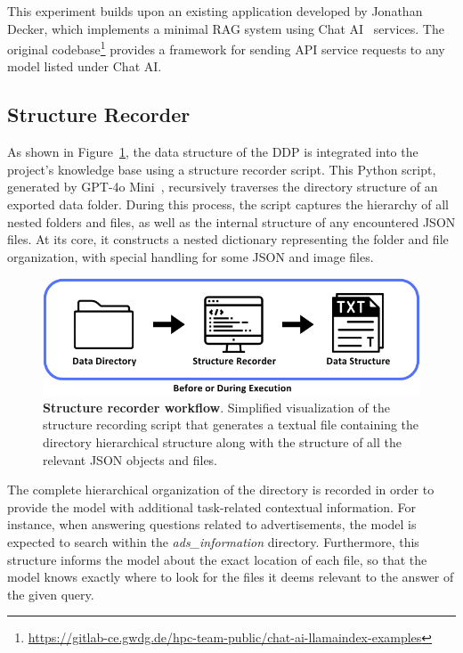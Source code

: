 \documentclass{DESSThesis}
\begin{document}
This experiment builds upon an existing application developed by Jonathan Decker, which implements a minimal RAG system using Chat AI~\cite{doosthosseini2024chataiseamlessslurmnative} services. The original codebase\footnote{\url{https://gitlab-ce.gwdg.de/hpc-team-public/chat-ai-llamaindex-examples}} provides a framework for sending API service requests to any model listed under Chat AI.

\subsection{Structure Recorder}

As shown in Figure~\ref{fig:structure_recorder}, the data structure of the DDP is integrated into the project's knowledge base using a structure recorder script. This Python script, generated by GPT-4o Mini~\cite{gpt-4o}, recursively traverses the directory structure of an exported data folder. During this process, the script captures the hierarchy of all nested folders and files, as well as the internal structure of any encountered JSON files. At its core, it constructs a nested dictionary representing the folder and file organization, with special handling for some JSON and image files.

\begin{figure}[h]
    \centering
    \includegraphics[width=0.70\linewidth]{img/Methodology/Structure Recorder.png}
    \caption[Structure recorder workflow]{\textbf{Structure recorder workflow}. Simplified visualization of the structure recording script that generates a textual file containing the directory hierarchical structure along with the structure of all the relevant JSON objects and files.}
    \label{fig:structure_recorder}
\end{figure}

The complete hierarchical organization of the directory is recorded in order to provide the model with additional task-related contextual information. For instance, when answering questions related to advertisements, the model is expected to search within the \emph{ads\_information} directory.  Furthermore, this structure informs the model about the exact location of each file, so that the model knows exactly where to look for the files it deems relevant to the answer of the given query.
\end{document}
